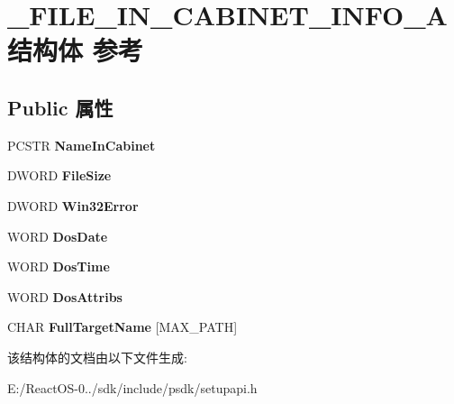 \hypertarget{struct___f_i_l_e___i_n___c_a_b_i_n_e_t___i_n_f_o___a}{}\section{\+\_\+\+F\+I\+L\+E\+\_\+\+I\+N\+\_\+\+C\+A\+B\+I\+N\+E\+T\+\_\+\+I\+N\+F\+O\+\_\+\+A结构体 参考}
\label{struct___f_i_l_e___i_n___c_a_b_i_n_e_t___i_n_f_o___a}
\subsection*{Public 属性}
\begin{DoxyCompactItemize}
\item 
\mbox{\label{struct___f_i_l_e___i_n___c_a_b_i_n_e_t___i_n_f_o___a_ae03f5fcb92058c17bcbcfc5025a456b9}} 
P\+C\+S\+TR {\bfseries Name\+In\+Cabinet}
\item 
\mbox{\label{struct___f_i_l_e___i_n___c_a_b_i_n_e_t___i_n_f_o___a_adb7382920534efab002d367bbcbaceb5}} 
D\+W\+O\+RD {\bfseries File\+Size}
\item 
\mbox{\label{struct___f_i_l_e___i_n___c_a_b_i_n_e_t___i_n_f_o___a_ad0760c6024379ac68de81943caab74d2}} 
D\+W\+O\+RD {\bfseries Win32\+Error}
\item 
\mbox{\label{struct___f_i_l_e___i_n___c_a_b_i_n_e_t___i_n_f_o___a_ad43374354346cbcb1b5a376797d39b45}} 
W\+O\+RD {\bfseries Dos\+Date}
\item 
\mbox{\label{struct___f_i_l_e___i_n___c_a_b_i_n_e_t___i_n_f_o___a_a97154856016efd41ba0cf8d042fb5543}} 
W\+O\+RD {\bfseries Dos\+Time}
\item 
\mbox{\label{struct___f_i_l_e___i_n___c_a_b_i_n_e_t___i_n_f_o___a_a851f4f627da5329061bcdf98dfe5a8b2}} 
W\+O\+RD {\bfseries Dos\+Attribs}
\item 
\mbox{\label{struct___f_i_l_e___i_n___c_a_b_i_n_e_t___i_n_f_o___a_a2008ef96879781d5b3a7bd8903b0ddeb}} 
C\+H\+AR {\bfseries Full\+Target\+Name} \mbox{[}M\+A\+X\+\_\+\+P\+A\+TH\mbox{]}
\end{DoxyCompactItemize}


该结构体的文档由以下文件生成\+:\begin{DoxyCompactItemize}
\item 
E\+:/\+React\+O\+S-\/0../sdk/include/psdk/setupapi.\+h\end{DoxyCompactItemize}
